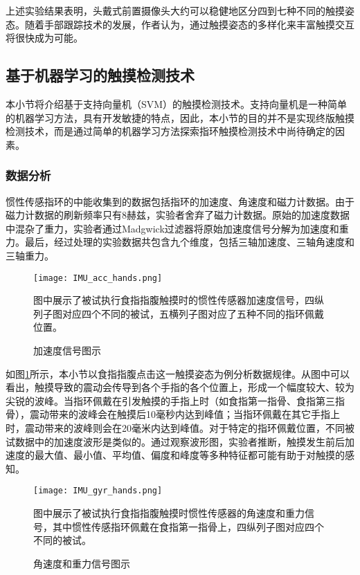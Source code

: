 上述实验结果表明，头戴式前置摄像头大约可以稳健地区分四到七种不同的触摸姿态。随着手部跟踪技术的发展\cite{ge2018hand, spurr2018cross, yuan2018depth}，作者认为，通过触摸姿态的多样化来丰富触摸交互将很快成为可能。

\subsection{基于机器学习的触摸检测技术}

本小节将介绍基于支持向量机（SVM）的触摸检测技术。支持向量机是一种简单的机器学习方法，具有开发敏捷的特点，因此，本小节的目的并不是实现终版触摸检测技术，而是通过简单的机器学习方法探索指环触摸检测技术中尚待确定的因素。

\subsubsection{数据分析}

惯性传感指环的中能收集到的数据包括指环的加速度、角速度和磁力计数据。由于磁力计数据的刷新频率只有8赫兹，实验者舍弃了磁力计数据。原始的加速度数据中混杂了重力，实验者通过Madgwick过滤器\cite{madgwick2010efficient}将原始加速度信号分解为加速度和重力。最后，经过处理的实验数据共包含九个维度，包括三轴加速度、三轴角速度和三轴重力。

\begin{figure}
	\centering
	\texttt{[image: IMU\_acc\_hands.png]}
	\caption*{图中展示了被试执行食指指腹触摸时的惯性传感器加速度信号，四纵列子图对应四个不同的被试，五横列子图对应了五种不同的指环佩戴位置。}
	\caption{加速度信号图示}
	\label{fig:IMU_acc_hands}
\end{figure}

如图\ref{fig:IMU_acc_hands}所示，本小节以食指指腹点击这一触摸姿态为例分析数据规律。从图中可以看出，触摸导致的震动会传导到各个手指的各个位置上，形成一个幅度较大、较为尖锐的波峰。当指环佩戴在引发触摸的手指上时（如食指第一指骨、食指第三指骨），震动带来的波峰会在触摸后10毫秒内达到峰值；当指环佩戴在其它手指上时，震动带来的波峰则会在20毫米内达到峰值。对于特定的指环佩戴位置，不同被试数据中的加速度波形是类似的。通过观察波形图，实验者推断，触摸发生前后加速度的最大值、最小值、平均值、偏度和峰度等多种特征都可能有助于对触摸的感知。

\begin{figure}
	\centering
	\texttt{[image: IMU\_gyr\_hands.png]}
	\caption*{图中展示了被试执行食指指腹触摸时惯性传感器的角速度和重力信号，其中惯性传感指环佩戴在食指第一指骨上，四纵列子图对应四个不同的被试。}
	\caption{角速度和重力信号图示}
	\label{fig:IMU_gyr_hands}
\end{figure}

